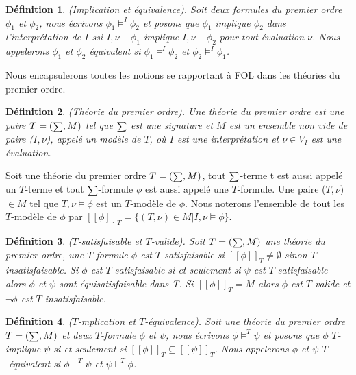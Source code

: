 \documentclass[9pt]{book}
\newtheorem{definition}{D\'efinition}[section]
\begin{document}
\begin{definition}
(Implication et \'equivalence). Soit deux formules du premier ordre $\phi_{1}$ et $\phi_{2}$, nous \'ecrivons $\phi_{1}\models^{I}\phi_{2}$ et posons que $\phi_{1}$ implique $\phi_{2}$ dans l'interpr\'etation de $I$ ssi $I,\nu\models\phi_{1}$ implique $I,\nu\models\phi_{2}$ pour tout \'evaluation $\nu$. Nous appelerons $\phi_{1}$  et $\phi_{2}$  \'equivalent si $\phi_{1}\models^{I}\phi_{2}$ et $\phi_{2}\models^{I}\phi_{1}$.
\end{definition}\par
Nous encapsulerons toutes les notions se rapportant \`a FOL dans les th\'eories du premier ordre.

\begin{definition}
(Th\'eorie du premier ordre). Une th\'eorie du premier ordre est une paire $T=(\mathsmaller \sum,M)$ tel que $\mathsmaller \sum$ est une signature et $M$ est un ensemble non vide de paire ($I,\nu$), appel\'e un mod\`ele de $T$, o\`u $I$ est une interpr\'etation et $\nu\in V_{I}$ est une \'evaluation.
\end{definition}

Soit une th\'eorie du premier ordre $T = (\mathsmaller \sum,M)$, tout $\mathsmaller \sum$-terme t est aussi appel\'e un $T$-terme et tout $\mathsmaller \sum$-formule $\phi$ est aussi appel\'e une $T$-formule. Une paire ($T,\nu$)$\in M$ tel que $T,\nu\models\phi$ est un $T$-mod\`ele de $\phi$. Nous noterons l'ensemble de tout les $T$-mod\`ele de $\phi$ par $[\![\phi]\!]_{T} = \{(T,\nu)\in M | I,\nu\models\phi\}$.

\begin{definition}
($T$-satisfaisable et $T$-valide). Soit $T = (\mathsmaller\sum,M)$ une th\'eorie du premier ordre, une $T$-formule $\phi$ est $T$-satisfaisable si $[\![\phi]\!]_{T} \neq \emptyset$ sinon $T$-insatisfaisable. Si $\phi$ est $T$-satisfaisable si et seulement si $\psi$ est $T$-satisfaisable alors $\phi$ et $\psi$ sont \'equisatisfaisable dans T. Si $[\![\phi]\!]_{T} = M$ alors $\phi$ est $T$-valide et $\neg\phi$ est $T$-insatisfaisable.
\end{definition}

\begin{definition}
($T$-mplication et $T$-\'equivalence). Soit une th\'eorie du premier ordre $T = (\mathsmaller \sum,M)$ et deux $T$-formule $\phi$ et $\psi$, nous \'ecrivons $\phi\models^{T}\psi$ et posons que $\phi$ $T$-implique $\psi$ si et seulement si $[\![\phi]\!]_{T}\subseteq [\![\psi]\!]_{T}$. Nous appelerons $\phi$  et $\psi$  $T$-\'equivalent si $\phi\models^{T}\psi$ et $\psi\models^{T}\phi$.
\end{definition}\par
\end{document}
